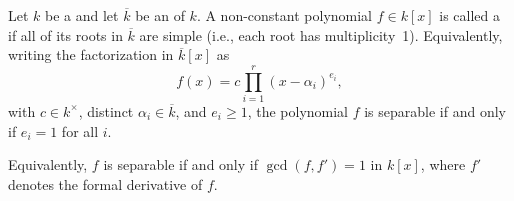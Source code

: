 \begin{definition} \label{definition:separable_polynomial_over_a_field}
Let $k$ be a  and let $\overline{k}$ be an  of $k$. A non-constant polynomial $f \in k[x]$ is called a  if all of its roots in $\overline{k}$ are simple (i.e., each root has multiplicity~1). Equivalently, writing the factorization in $\overline{k}[x]$ as
$$f(x) = c \prod_{i=1}^r (x - \alpha_i)^{e_i},$$
with $c \in k^\times$, distinct $\alpha_i \in \overline{k}$, and $e_i \ge 1$, the polynomial $f$ is separable if and only if $e_i = 1$ for all $i$.

Equivalently, $f$ is separable if and only if $\gcd(f, f') = 1$ in $k[x]$, where $f'$ denotes the formal derivative of $f$.
\end{definition}